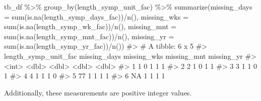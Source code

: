 \documentclass[
  letterpaper,
]{latex/krantz}
\makeatletter
\newenvironment{Shaded}{\begin{snugshade}}{\end{snugshade}}
\newcommand{\AttributeTok}[1]{\textcolor[rgb]{0.40,0.45,0.13}{#1}}
\newcommand{\CommentTok}[1]{\textcolor[rgb]{0.37,0.37,0.37}{#1}}
\newcommand{\ConstantTok}[1]{\textcolor[rgb]{0.56,0.35,0.01}{#1}}
\newcommand{\FunctionTok}[1]{\textcolor[rgb]{0.28,0.35,0.67}{#1}}
\newcommand{\NormalTok}[1]{\textcolor[rgb]{0.00,0.23,0.31}{#1}}
\newcommand{\SpecialCharTok}[1]{\textcolor[rgb]{0.37,0.37,0.37}{#1}}
\newenvironment{kframe}{%
\medskip{}
\setlength{\fboxsep}{.8em}
 \def\at@end@of@kframe{}%
 \ifinner\ifhmode%
  \def\at@end@of@kframe{\end{minipage}}%
  \begin{minipage}{\columnwidth}%
 \fi\fi%
 \def\FrameCommand##1{\hskip\@totalleftmargin \hskip-\fboxsep
 \colorbox{shadecolor}{##1}\hskip-\fboxsep
     \hskip-\linewidth \hskip-\@totalleftmargin \hskip\columnwidth}%
 \MakeFramed {\advance\hsize-\width
   \@totalleftmargin\z@ \linewidth\hsize
   \@setminipage}}%
 {\par\unskip\endMakeFramed%
 \at@end@of@kframe}
\renewenvironment{Shaded}{\begin{kframe}}{\end{kframe}}
\makeatother
\begin{document}
\begin{Shaded}
\begin{Highlighting}[]
\NormalTok{tb\_df }\SpecialCharTok{\%\textgreater{}\%}
  \FunctionTok{group\_by}\NormalTok{(length\_symp\_unit\_fac) }\SpecialCharTok{\%\textgreater{}\%}
  \FunctionTok{summarize}\NormalTok{(}\AttributeTok{missing\_days =} \FunctionTok{sum}\NormalTok{(}\FunctionTok{is.na}\NormalTok{(length\_symp\_days\_fac))}\SpecialCharTok{/}\FunctionTok{n}\NormalTok{(),}
            \AttributeTok{missing\_wks =} \FunctionTok{sum}\NormalTok{(}\FunctionTok{is.na}\NormalTok{(length\_symp\_wk\_fac))}\SpecialCharTok{/}\FunctionTok{n}\NormalTok{(),}
            \AttributeTok{missing\_mnt =} \FunctionTok{sum}\NormalTok{(}\FunctionTok{is.na}\NormalTok{(length\_symp\_mnt\_fac))}\SpecialCharTok{/}\FunctionTok{n}\NormalTok{(),}
            \AttributeTok{missing\_yr =} \FunctionTok{sum}\NormalTok{(}\FunctionTok{is.na}\NormalTok{(length\_symp\_yr\_fac))}\SpecialCharTok{/}\FunctionTok{n}\NormalTok{())}
\CommentTok{\#\textgreater{} \# A tibble: 6 x 5}
\CommentTok{\#\textgreater{}   length\_symp\_unit\_fac missing\_days missing\_wks missing\_mnt missing\_yr}
\CommentTok{\#\textgreater{}                  \textless{}int\textgreater{}        \textless{}dbl\textgreater{}       \textless{}dbl\textgreater{}       \textless{}dbl\textgreater{}      \textless{}dbl\textgreater{}}
\CommentTok{\#\textgreater{} 1                    1            0           1           1          1}
\CommentTok{\#\textgreater{} 2                    2            1           0           1          1}
\CommentTok{\#\textgreater{} 3                    3            1           1           0          1}
\CommentTok{\#\textgreater{} 4                    4            1           1           1          0}
\CommentTok{\#\textgreater{} 5                   77            1           1           1          1}
\CommentTok{\#\textgreater{} 6                   NA            1           1           1          1}
\end{Highlighting}
\end{Shaded}

Additionally, these measurements are positive integer values.

\begin{Shaded}
\end{Shaded}
\end{document}
